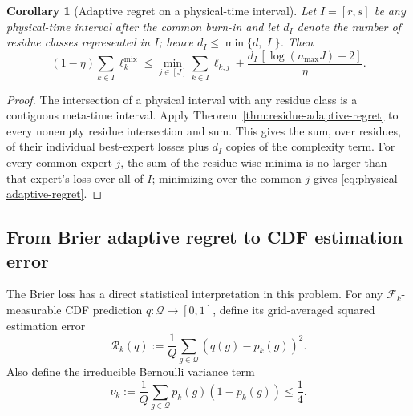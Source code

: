 \documentclass[11pt]{article}
\newtheorem{corollary}[theorem]{Corollary}
\newcommand{\F}{\mathcal{F}}
\newcommand{\Q}{\mathcal{Q}}
\newcommand{\1}{\mathbf{1}}
\begin{document}
\begin{corollary}[Adaptive regret on a physical-time interval]
\label{cor:physical-adaptive-regret}
Let $I=[r,s]$ be any physical-time interval after the common burn-in and let
$d_I$ denote the number of residue classes represented in $I$; hence
$d_I\le\min\{d,|I|\}$.  Then
\begin{equation}
\boxed{
    (1-\eta)
    \sum_{k\in I}
    \ell_k^{\mathrm{mix}}
    \le
    \min_{j\in[J]}
    \sum_{k\in I}
    \ell_{k,j}
    +
    \frac{d_I\,[\log(n_{\max}J)+2]}{\eta}.
}
\label{eq:physical-adaptive-regret}
\end{equation}
\end{corollary}

\begin{proof}
The intersection of a physical interval with any residue class is a contiguous
meta-time interval.  Apply Theorem~\ref{thm:residue-adaptive-regret} to every
nonempty residue intersection and sum.  This gives the sum, over residues, of
their individual best-expert losses plus $d_I$ copies of the complexity term.
For every common expert $j$, the sum of the residue-wise minima is no larger
than that expert's loss over all of $I$; minimizing over the common $j$ gives
\eqref{eq:physical-adaptive-regret}.
\end{proof}

\subsection{From Brier adaptive regret to CDF estimation error}

The Brier loss has a direct statistical interpretation in this problem.  For
any $\F_k$-measurable CDF prediction $q:\Q\to[0,1]$, define its grid-averaged
squared estimation error
\begin{equation}
    \mathcal R_k(q)
    :=
    \frac1Q
    \sum_{g\in\Q}
    (q(g)-p_k(g))^2.
    \label{eq:grid-mse-risk}
\end{equation}
Also define the irreducible Bernoulli variance term
\begin{equation}
    \nu_k
    :=
    \frac1Q
    \sum_{g\in\Q}
    p_k(g)(1-p_k(g))
    \le\frac14.
    \label{eq:brier-noise}
\end{equation}
\end{document}

